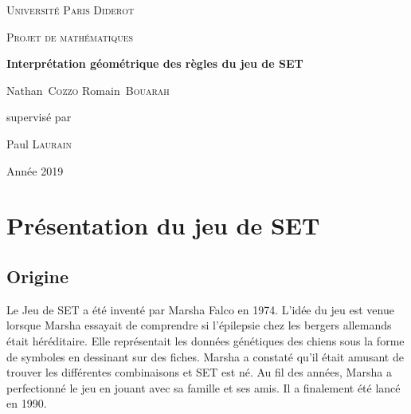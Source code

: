 \documentclass[a4paper,12pt,titlepage]{article}
\theoremstyle{plain}
\theoremstyle{definition}
\begin{document}
\begin{titlepage}
  \centering
  {\Large\scshape Université Paris Diderot\par}
  \vspace{2cm}	
  
  {\LARGE\scshape Projet de mathématiques\par}
  \vspace{0.5cm}
  
  {\Huge\bfseries Interprétation géométrique des règles du jeu de SET\par}
  \vspace{1.5cm}

  {\Large \hspace{2em}Nathan~\textsc{Cozzo} \hspace{2cm} Romain~\textsc{Bouarah}}

  \vfill
      {supervisé par\par
	Paul \textsc{Laurain}}

      \vfill

      {\large Année 2019}
\end{titlepage}

\begin{abstract}
  Dans ce sujet, on verra comment interpréter les règles du jeu de SET de manière géométrique, 
  puis grâce à cette interprétation comment déterminer le nombre de cartes minimal à disposer devant soi pour 	pouvoir toujours trouver un triplet de cartes.
\end{abstract}

\tableofcontents

\newpage

\section{Présentation du jeu de SET}
\subsection{Origine}
Le Jeu de SET a été inventé par Marsha Falco en 1974. L'idée du jeu est venue lorsque Marsha essayait de comprendre si l'épilepsie chez les bergers allemands était héréditaire. 
Elle représentait les données génétiques des chiens sous la forme de symboles en dessinant sur des fiches. 
Marsha a constaté qu'il était amusant de trouver les différentes combinaisons et SET est né. Au fil des années, Marsha a perfectionné le jeu en jouant avec sa famille et ses amis. 
Il a finalement été lancé en 1990.
\end{document}
